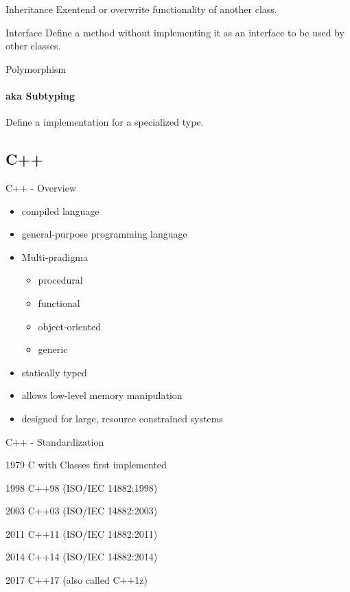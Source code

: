 \documentclass{beamer}
\begin{document}
\begin{frame}{Inheritance}
Exentend or overwrite functionality of another class.
\end{frame}

\begin{frame}{Interface}
Define a method without implementing it as an interface to be used by other
classes.
\end{frame}

\begin{frame}{Polymorphism}
\framesubtitle{aka Subtyping}
Define a implementation for a specialized type.
\end{frame}

\subsection{C++}
\begin{frame}{C++ - Overview}
\begin{itemize}
  \item compiled language
  \item general-purpose programming language
  \item Multi-pradigma
  \begin{itemize}
    \item procedural
    \item functional
    \item object-oriented
    \item generic
  \end{itemize}
  \item statically typed
  \item allows low-level memory manipulation
  \item designed for large, resource constrained systems 
\end{itemize}
\end{frame}


\begin{frame}{C++ - Standardization}
\itemize{}
\item[1979] C with Classes first implemented 
\item[1998] C++98 (ISO/IEC 14882:1998) 
\item[2003] C++03 (ISO/IEC 14882:2003)
\item[2011] C++11 (ISO/IEC 14882:2011)
\item[2014] C++14 (ISO/IEC 14882:2014)
\item[2017] C++17 (also called C++1z)
\end{frame}
\end{document}
